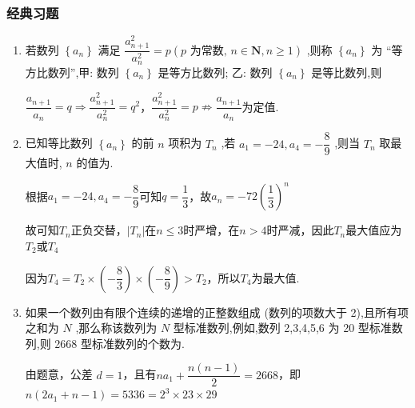 \subsubsection*{经典习题}
\begin{enumerate}
    \item 若数列 $\left\{  {a}_{n}\right\}$ 满足 $\dfrac{{a}_{n + 1}^{2}}{{a}_{n}^{2}} = p\left( {p\text{ 为常数, }n \in  \mathbf{N},n \geq  1}\right)$ ,则称 $\left\{  {a}_{n}\right\}$ 为 “等方比数列”,甲: 数列 $\left\{  {a}_{n}\right\}$ 是等方比数列; 乙: 数列 $\left\{  {a}_{n}\right\}$ 是等比数列,则
    \begin{jieda}
        $\dfrac{{a}_{n + 1}}{{a}_{n}} = q \Longrightarrow \dfrac{{a}_{n + 1}^{2}}{{a}_{n}^{2}} = q^2$，$\dfrac{{a}_{n + 1}^2}{{a}_{n}^2} = p \not \Longrightarrow \dfrac{{a}_{n + 1}}{{a}_{n}}$为定值.
    \end{jieda}
    \item 已知等比数列 $\left\{  {a}_{n}\right\}$ 的前 $n$ 项积为 ${T}_{n}$ ,若 ${a}_{1} =  - {24},{a}_{4} =  - \dfrac{8}{9}$ ,则当 ${T}_{n}$ 取最大值时, $n$ 的值为.
    \begin{jieda}
        根据${a}_{1} =  - {24},{a}_{4} =  - \dfrac{8}{9}$可知$q = \dfrac{1}{3}$，故$a_n = -72 \left(\dfrac{1}{3}\right)^n$

        故可知$T_n$正负交替，$|T_n|$在$n \leq 3$时严增，在$n > 4$时严减，因此$T_n$最大值应为$T_2$或$T_4$

        因为$T_4 = T_2 \times \left(-\dfrac{8}{3}\right) \times \left(-\dfrac{8}{9}\right) > T_2$，所以$T_4$为最大值.
    \end{jieda}
    \item 如果一个数列由有限个连续的递增的正整数组成 (数列的项数大于 2),且所有项之和为 $N$ ,那么称该数列为 $N$ 型标准数列,例如,数列 2,3,4,5,6 为 20 型标准数列,则 2668 型标准数列的个数为.
    \begin{jieda}
        由题意，公差 ${d} = 1$，且有$n a_1 + \dfrac{n\left( {n - 1}\right) }{2} = {2668}$，即$ {n}\left( {2{a}_1 + {n} - 1}\right)  = {5336} = {2}^{3} \times  {23} \times  {29}$
        

\end{jieda}
\end{enumerate}
